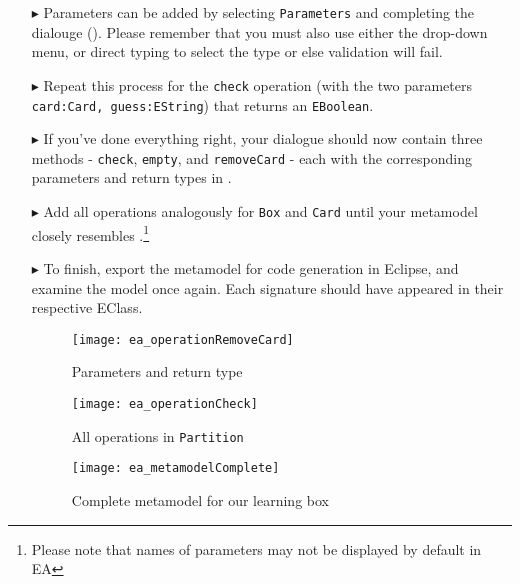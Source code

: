 \begin{enumerate}
\item[$\blacktriangleright$] Parameters can be added by selecting \texttt{Parameters} and
completing the dialouge (). Please remember that you must also use either the drop-down menu, or direct typing to select the type or else validation
will fail.

\item[$\blacktriangleright$] Repeat this process for the \texttt{check} operation (with the two parameters \texttt{card:Card, guess:EString}) that returns an \texttt{EBoolean}. 

\item[$\blacktriangleright$] If you've done everything right, your dialogue should now contain three methods - \texttt{check}, \texttt{empty}, and
\texttt{removeCard} - each with the corresponding parameters and return types in .


\item[$\blacktriangleright$] Add all operations analogously for \texttt{Box} and \texttt{Card} until your metamodel closely resembles
.\footnote{Please note that names of parameters may not be displayed by default in EA}

\item[$\blacktriangleright$] To finish, export the metamodel for code generation in Eclipse, and examine the model once again. Each signature should have
appeared in their respective EClass.

\newpage

\vspace*{1cm}

\begin{figure}[htbp]
	\centering
  \texttt{[image: ea\_operationRemoveCard]}
	\caption{Parameters and return type}
	\label{ea:operation_parameters}
\end{figure}

\vspace{1cm}

\begin{figure}[h!]
	\centering
  \texttt{[image: ea\_operationCheck]}
	\caption{All operations in \texttt{Partition}}
	\label{ea:operation_partition}
\end{figure}

\newpage


\begin{figure}[htbp]
	\centering
  \texttt{[image: ea\_metamodelComplete]}
\caption[Complete metamodel for our learning box.]{Complete metamodel for our learning box}
	\label{ea:metamodel_complete}
\end{figure}
\FloatBarrier

\end{enumerate}

